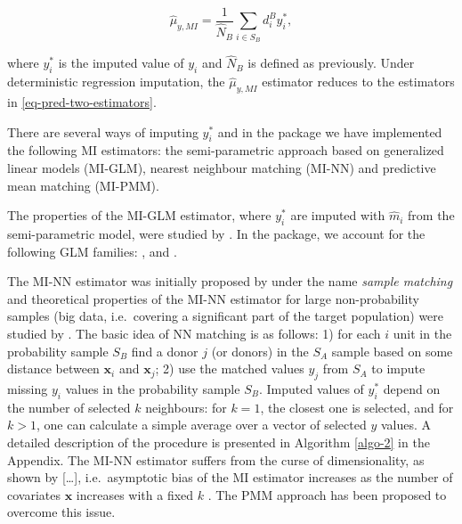 \documentclass[
]{jss}
\begin{document}
\begin{equation}
\hat{\mu}_{y,MI}=\frac{1}{\hat{N}_{B}} \sum_{i \in S_{B}} d_i^{B} y_i^*, 
\end{equation}

where \(y_i^*\) is the imputed value of \(y_i\) and \(\hat{N}_{B}\) is
defined as previously. Under deterministic regression imputation, the
\(\hat{\mu}_{y,MI}\) estimator reduces to the estimators in
\eqref{eq-pred-two-estimators}.

There are several ways of imputing \(y_i^*\) and in the package we have
implemented the following MI estimators: the semi-parametric approach
based on generalized linear models (MI-GLM), nearest neighbour matching
(MI-NN) and predictive mean matching (MI-PMM).

The properties of the MI-GLM estimator, where \(y_i^*\) are imputed with
\(\hat{m}_i\) from the semi-parametric model, were studied by
\citet{kim_combining_2021}. In the  package, we account
for the following GLM families: ,  and
.

The MI-NN estimator was initially proposed by \citet{rivers2007sampling}
under the name \textit{sample matching} and theoretical properties of
the MI-NN estimator for large non-probability samples (big data,
i.e.~covering a significant part of the target population) were studied
by \citet{yang2021integration}. The basic idea of NN matching is as
follows: 1) for each \(i\) unit in the probability sample \(S_B\) find a
donor \(j\) (or donors) in the \(S_A\) sample based on some distance
between \(\boldsymbol{x}_i\) and \(\boldsymbol{x}_j\); 2) use the
matched values \(y_j\) from \(S_A\) to impute missing \(y_i\) values in
the probability sample \(S_B\). Imputed values of \(y_i^*\) depend on
the number of selected \(k\) neighbours: for \(k=1\), the closest one is
selected, and for \(k>1\), one can calculate a simple average over a
vector of selected \(y\) values. A detailed description of the procedure
is presented in Algorithm \ref{algo-2} in the Appendix. The MI-NN
estimator suffers from the curse of dimensionality, as shown by
{[}\ldots{]}, i.e.~asymptotic bias of the MI estimator increases as the
number of covariates \(\boldsymbol{x}\) increases with a fixed \(k\)
\citep{abadie2006large, yang_asymptotic_2020}. The PMM approach has been
proposed to overcome this issue.
\end{document}
